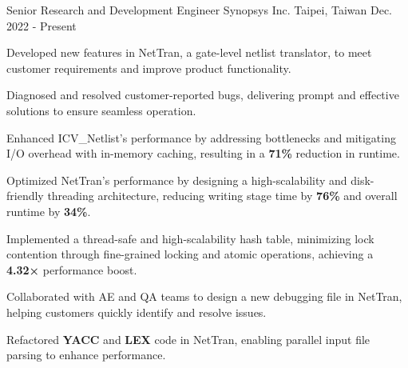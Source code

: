 

\begin{cventries}

  \cventry
    {Senior Research and Development Engineer} %
    {Synopsys Inc.} %
    {Taipei, Taiwan} %
    {Dec. 2022 - Present} %
    {
      \begin{cvitems} %
        \item {Developed new features in NetTran, a gate-level netlist translator, to meet customer requirements and improve product functionality.}
        \item {Diagnosed and resolved customer-reported bugs, delivering prompt and effective solutions to ensure seamless operation.}
        \item {Enhanced ICV\_Netlist’s performance by addressing bottlenecks and mitigating I/O overhead with in-memory caching, resulting in a \textbf{71\%} reduction in runtime.}
        \item {Optimized NetTran’s performance by designing a high-scalability and disk-friendly threading architecture, reducing writing stage time by \textbf{76\%} and overall runtime by \textbf{34\%}.}
        \item {Implemented a thread-safe and high-scalability hash table, minimizing lock contention through fine-grained locking and atomic operations, achieving a \textbf{4.32×} performance boost.}
        \item {Collaborated with AE and QA teams to design a new debugging file in NetTran, helping customers quickly identify and resolve issues.}
        \item {Refactored \textbf{YACC} and \textbf{LEX} code in NetTran, enabling parallel input file parsing to enhance performance.}
      \end{cvitems}
    }

\end{cventries}
